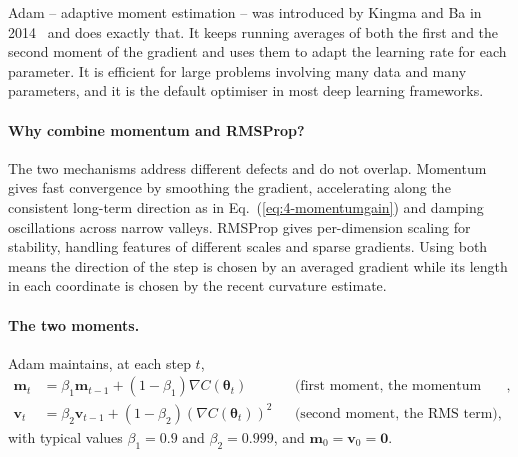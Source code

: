Adam -- adaptive moment estimation -- was introduced by Kingma and Ba in
2014~\cite{kingma2014} and does exactly that.  It keeps running averages of
both the first and the second moment of the gradient and uses them to adapt
the learning rate for each parameter.  It is efficient for large problems
involving many data and many parameters, and it is the default optimiser in
most deep learning frameworks.

\paragraph{Why combine momentum and RMSProp?}
The two mechanisms address different defects and do not overlap.  Momentum
gives fast convergence by smoothing the gradient, accelerating along the
consistent long-term direction as in Eq.~(\ref{eq:4-momentumgain}) and damping
oscillations across narrow valleys.  RMSProp gives per-dimension scaling for
stability, handling features of different scales and sparse gradients.  Using
both means the direction of the step is chosen by an averaged gradient while
its length in each coordinate is chosen by the recent curvature estimate.

\paragraph{The two moments.}
Adam maintains, at each step $t$,
\begin{align}
  \bm{m}_t &= \beta_1\bm{m}_{t-1} + (1-\beta_1)\nabla C(\bm{\theta}_t)
   && \text{(first moment, the momentum term)},
  \label{eq:4-adamfirst}\\
  \bm{v}_t &= \beta_2\bm{v}_{t-1}
    + (1-\beta_2)\left(\nabla C(\bm{\theta}_t)\right)^{2}
   && \text{(second moment, the RMS term)},
  \label{eq:4-adamsecond}
\end{align}
with typical values $\beta_1=0.9$ and $\beta_2=0.999$, and
$\bm{m}_0=\bm{v}_0=\bm{0}$.


